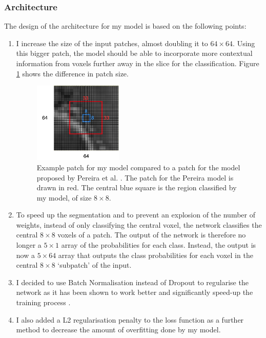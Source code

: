 \documentclass[12pt,a4paper,twoside,openright]{report}
\begin{document}
\subsubsection{Architecture}
The design of the architecture for my model is based on the following points:
\begin{enumerate}
	\item I increase the size of the input patches, almost doubling it to $64 \times 64$. Using this bigger patch, the model should be able to incorporate more contextual information from voxels further away in the slice for the classification. Figure \ref{fig:bigger_patches} shows the difference in patch size.
		\begin{figure}
			\centering
			\includegraphics[width=0.4\textwidth]{bigger_patches}
			\caption[Example patch for my model compared to a patch for the model proposed by Pereira et al. \cite{pereira}]{Example patch for my model compared to a patch for the model proposed by Pereira et al. \cite{pereira}. The patch for the Pereira model is drawn in red. The central blue square is the region classified by my model, of size $8 \times 8$.}
			\label{fig:bigger_patches}
		\end{figure}
	\item To speed up the segmentation and to prevent an explosion of the number of weights, instead of only classifying the central voxel, the network classifies the central $8 \times 8$ voxels of a patch. The output of the network is therefore no longer a $5 \times 1$ array of the probabilities for each class. Instead, the output is now a $5 \times 64$ array that outputs the class probabilities for each voxel in the central $8 \times 8$ `subpatch' of the input. 
	\item I decided to use Batch Normalisation instead of Dropout to regularise the network as it has been shown to work better and significantly speed-up the training process \cite{batch_normalization}. 
	\item I also added a L2 regularisation penalty to the loss function as a further method to decrease the amount of overfitting done by my model.

\end{enumerate}
\end{document}
